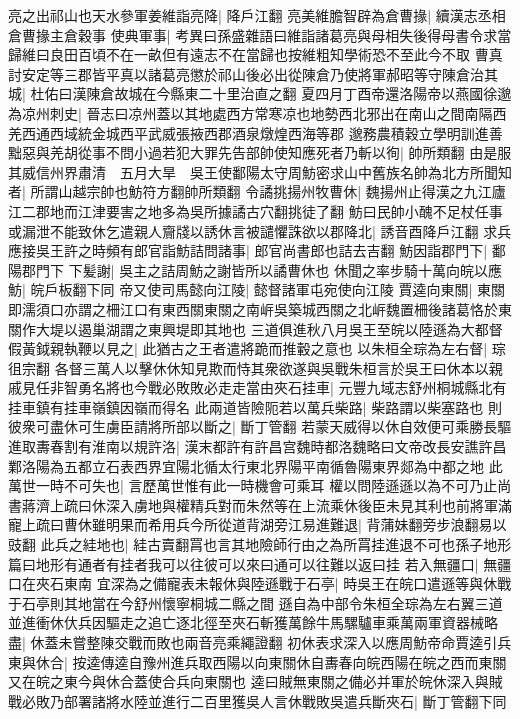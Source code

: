 亮之出祁山也天水參軍姜維詣亮降|{
	降戶江翻}
亮美維膽智辟為倉曹掾|{
	續漢志丞相倉曹掾主倉穀事}
使典軍事|{
	考異曰孫盛雜語曰維詣諸葛亮與母相失後得母書令求當歸維曰良田百頃不在一畝但有遠志不在當歸也按維粗知學術恐不至此今不取}
曹真討安定等三郡皆平真以諸葛亮懲於祁山後必出從陳倉乃使將軍郝昭等守陳倉治其城|{
	杜佑曰漢陳倉故城在今縣東二十里治直之翻}
夏四月丁酉帝還洛陽帝以燕國徐邈為凉州刺史|{
	晉志曰凉州蓋以其地處西方常寒凉也地勢西北邪出在南山之間南隔西羌西通西域統金城西平武威張掖西郡酒泉燉煌西海等郡}
邈務農積穀立學明訓進善黜惡與羌胡從事不問小過若犯大罪先告部帥使知應死者乃斬以徇|{
	帥所類翻}
由是服其威信州界肅清　五月大旱　吳王使鄱陽太守周魴密求山中舊族名帥為北方所聞知者|{
	所謂山越宗帥也魴符方翻帥所類翻}
令譎挑揚州牧曹休|{
	魏揚州止得漢之九江廬江二郡地而江津要害之地多為吳所據譎古穴翻挑徒了翻}
魴曰民帥小醜不足杖任事或漏泄不能致休乞遣親人齎牋以誘休言被譴懼誅欲以郡降北|{
	誘音酉降戶江翻}
求兵應接吳王許之時頻有郎官詣魴詰問諸事|{
	郎官尚書郎也詰去吉翻}
魴因詣郡門下|{
	鄱陽郡門下}
下髪謝|{
	吳主之詰周魴之謝皆所以譎曹休也}
休聞之率步騎十萬向皖以應魴|{
	皖戶板翻下同}
帝又使司馬懿向江陵|{
	懿督諸軍屯宛使向江陵}
賈逵向東關|{
	東關即濡須口亦謂之柵江口有東西關東關之南㟁吳築城西關之北㟁魏置柵後諸葛恪於東關作大堤以遏巢湖謂之東興堤即其地也}
三道俱進秋八月吳王至皖以陸遜為大都督假黃鉞親執鞭以見之|{
	此猶古之王者遣將跪而推轂之意也}
以朱桓全琮為左右督|{
	琮徂宗翻}
各督三萬人以擊休休知見欺而恃其衆欲遂與吳戰朱桓言於吳王曰休本以親戚見任非智勇名將也今戰必敗敗必走走當由夾石挂車|{
	元豐九域志舒州桐城縣北有挂車鎮有挂車嶺鎮因嶺而得名}
此兩道皆險阨若以萬兵柴路|{
	柴路謂以柴塞路也}
則彼衆可盡休可生虜臣請將所部以斷之|{
	斷丁管翻}
若蒙天威得以休自效便可乘勝長驅進取夀春割有淮南以規許洛|{
	漢末都許有許昌宫魏時都洛魏略曰文帝改長安譙許昌鄴洛陽為五都立石表西界宜陽北循太行東北界陽平南循魯陽東界郯為中都之地}
此萬世一時不可失也|{
	言歷萬世惟有此一時機會可乘耳}
權以問陸遜遜以為不可乃止尚書蔣濟上疏曰休深入虜地與權精兵對而朱然等在上流乘休後臣未見其利也前將軍滿寵上疏曰曹休雖明果而希用兵今所從道背湖旁江易進難退|{
	背蒲妹翻旁步浪翻易以豉翻}
此兵之絓地也|{
	絓古賣翻罥也言其地險師行由之為所罥挂進退不可也孫子地形篇曰地形有通者有挂者我可以往彼可以來曰通可以往難以返曰挂}
若入無疆口|{
	無疆口在夾石東南}
宜深為之備寵表未報休與陸遜戰于石亭|{
	時吳王在皖口遣遜等與休戰于石亭則其地當在今舒州懷寧桐城二縣之間}
遜自為中部令朱桓全琮為左右翼三道並進衝休㐲兵因驅走之追亡逐北徑至夾石斬獲萬餘牛馬騾驢車乘萬兩軍資器械略盡|{
	休蓋未嘗整陳交戰而敗也兩音亮乘繩證翻}
初休表求深入以應周魴帝命賈逵引兵東與休合|{
	按逵傳逵自豫州進兵取西陽以向東關休自夀春向皖西陽在皖之西而東關又在皖之東今與休合蓋使合兵向東關也}
逵曰賊無東關之備必并軍於皖休深入與賊戰必敗乃部署諸將水陸並進行二百里獲吳人言休戰敗吳遣兵斷夾石|{
	斷丁管翻下同}
